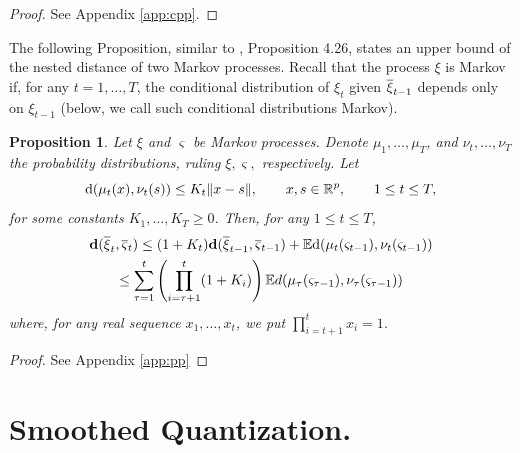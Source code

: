 \documentclass{article}              %
\newtheorem{proposition}{Proposition}
\begin{document}
\begin{proof} See Appendix \ref{app:cpp}.
\end{proof}


\noindent The following Proposition, similar to \cite{pflug2014multistage},
Proposition 4.26, states an upper bound of the nested distance of
two Markov processes. Recall that the process $\xi$ is Markov if, for any $t=1,\dots,T$, the conditional distribution of $\xi_t$ given $\overline{\xi}_{t-1}$ depends only on $\xi_{t-1}$ (below, we call such conditional distributions Markov). 
\begin{proposition}
\label{prop:pp} Let $\xi$ and $\varsigma$ be Markov processes. Denote $\mu_{1},\dots,\mu_{T}$,
and $\nu_{t},\dots,\nu_{T}$ the probability distributions, ruling $\xi,\varsigma,$
respectively.
Let
\begin{equation}
\mathrm{d}(\mu_{t}(x),\nu_{t}(s))\leq K_{t}\|x-s\|,\qquad x,s\in\mathbb{R}^{p},\qquad1\leq t\leq T,\label{eq:ktl}
\end{equation}
for some constants $K_{1},\dots,K_{T}\geq 0$. Then, for any $1\leq t\leq T$,
\begin{multline}
\mathbf{d}(\overline{\xi}_{t},\overline{\varsigma}_{t})\leq(1+K_{t})\mathbf{d}(\overline{\xi}_{t-1},\overline{\varsigma}_{t-1})+\mathbb{E}\mathrm{d}(\mu_{t}(\varsigma_{t-1}),\nu_{t}(\varsigma_{t-1}))\\
\leq\sum_{\tau=1}^{t}\left(\prod_{i=\tau+1}^{t}(1+K_{i})\right)\mathbb{E} d(\mu_{\tau}(\varsigma_{\text{\ensuremath{\tau}}-1}),\nu_{\tau}(\varsigma_{\tau-1}))\label{eq:df}
\end{multline}
where, for any real sequence $x_1,\dots,x_{t}$, we put $\prod_{i=t+1}^{t} x_i = 1$.
\end{proposition}

\begin{proof} See Appendix \ref{app:pp}
\end{proof}

\section{\label{sec:sq}Smoothed Quantization.}
\end{document}
